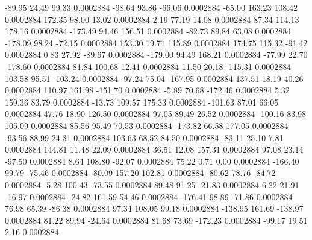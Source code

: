       -89.95       24.49       99.33     0.0002884
      -98.64       93.86      -66.06     0.0002884
      -65.00      163.23      108.42     0.0002884
      172.35       98.00       13.02     0.0002884
        2.19       77.19       14.08     0.0002884
       87.34      114.13      178.16     0.0002884
     -173.49       94.46      156.51     0.0002884
      -82.73       89.84       63.08     0.0002884
     -178.09       98.24      -72.15     0.0002884
      153.30       19.71      115.89     0.0002884
      174.75      115.32      -91.42     0.0002884
        0.83       27.92      -89.67     0.0002884
     -179.00       94.49      168.21     0.0002884
      -77.99       22.70     -178.60     0.0002884
       81.84      100.68       12.41     0.0002884
       11.50       20.18     -115.31     0.0002884
      103.58       95.51     -103.24     0.0002884
      -97.24       75.04     -167.95     0.0002884
      137.51       18.19       40.26     0.0002884
      110.97      161.98     -151.70     0.0002884
       -5.89       70.68     -172.46     0.0002884
        5.32      159.36       83.79     0.0002884
      -13.73      109.57      175.33     0.0002884
     -101.63       87.01       66.05     0.0002884
       47.76       18.90      126.50     0.0002884
       97.05       89.49       26.52     0.0002884
     -100.16       83.98      105.09     0.0002884
       85.56       95.49       70.53     0.0002884
     -173.82       66.58      177.05     0.0002884
      -93.56       88.99       24.31     0.0002884
      103.63       68.52       84.50     0.0002884
      -83.11       25.10        7.81     0.0002884
      144.81       11.48       22.09     0.0002884
       36.51       12.08      157.31     0.0002884
       97.08       23.14      -97.50     0.0002884
        8.64      108.80      -92.07     0.0002884
       75.22        0.71        0.00     0.0002884
     -166.40       99.79      -75.46     0.0002884
      -80.09      157.20      102.81     0.0002884
      -80.62       78.76      -84.72     0.0002884
       -5.28      100.43      -73.55     0.0002884
       89.48       91.25      -21.83     0.0002884
        6.22       21.91      -16.97     0.0002884
      -24.82      161.59       54.46     0.0002884
     -176.41       98.89      -71.86     0.0002884
       76.98       65.39      -86.38     0.0002884
       97.34      108.05       99.18     0.0002884
     -138.95      161.69     -138.97     0.0002884
       81.22       89.94      -24.64     0.0002884
       81.68       73.69     -172.23     0.0002884
      -99.17       19.51        2.16     0.0002884
